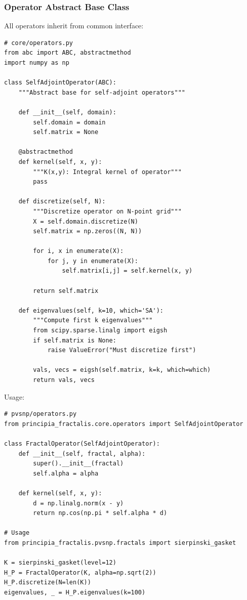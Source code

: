 \subsubsection{Operator Abstract Base Class}

All operators inherit from common interface:

\begin{verbatim}
# core/operators.py
from abc import ABC, abstractmethod
import numpy as np

class SelfAdjointOperator(ABC):
    """Abstract base for self-adjoint operators"""

    def __init__(self, domain):
        self.domain = domain
        self.matrix = None

    @abstractmethod
    def kernel(self, x, y):
        """K(x,y): Integral kernel of operator"""
        pass

    def discretize(self, N):
        """Discretize operator on N-point grid"""
        X = self.domain.discretize(N)
        self.matrix = np.zeros((N, N))

        for i, x in enumerate(X):
            for j, y in enumerate(X):
                self.matrix[i,j] = self.kernel(x, y)

        return self.matrix

    def eigenvalues(self, k=10, which='SA'):
        """Compute first k eigenvalues"""
        from scipy.sparse.linalg import eigsh
        if self.matrix is None:
            raise ValueError("Must discretize first")

        vals, vecs = eigsh(self.matrix, k=k, which=which)
        return vals, vecs
\end{verbatim}

Usage:
\begin{verbatim}
# pvsnp/operators.py
from principia_fractalis.core.operators import SelfAdjointOperator

class FractalOperator(SelfAdjointOperator):
    def __init__(self, fractal, alpha):
        super().__init__(fractal)
        self.alpha = alpha

    def kernel(self, x, y):
        d = np.linalg.norm(x - y)
        return np.cos(np.pi * self.alpha * d)

# Usage
from principia_fractalis.pvsnp.fractals import sierpinski_gasket

K = sierpinski_gasket(level=12)
H_P = FractalOperator(K, alpha=np.sqrt(2))
H_P.discretize(N=len(K))
eigenvalues, _ = H_P.eigenvalues(k=100)
\end{verbatim}

